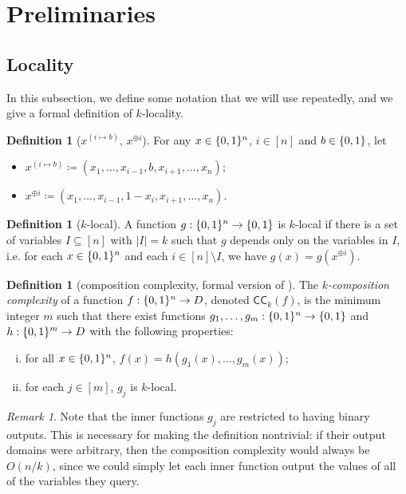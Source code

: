 \documentclass[10pt,a4paper]{article}
\theoremstyle{definition}
\newtheorem{definition}[lemma]{Definition}
\theoremstyle{remark}
\newtheorem{remark}[lemma]{Remark}
\DeclarePairedDelimiter{\set}{\{}{\}}
\newcommand{\zo}{\set{0,1}}
\newcommand{\CC}{\mathsf{CC}}
\begin{document}


\section{Preliminaries}

\subsection{Locality}
In this subsection, we define some notation that we will use repeatedly, and we give a formal definition of $k$-locality.

\begin{definition}[$x^{(i \mapsto b)}$, $x^{\oplus i}$]
For any $x \in \zo^n$, $i \in [n]$ and $b \in \zo$, let
\begin{itemize}
    \item $x^{(i \mapsto b)} \coloneqq (x_1, \ldots, x_{i-1}, b, x_{i+1}, \ldots, x_n)$;
    \item $x^{\oplus i} \coloneqq (x_1, \ldots, x_{i-1}, 1-x_i, x_{i+1}, \ldots, x_n)$.
\end{itemize}
\end{definition}

\begin{definition}[$k$-local]
A function $g: \zo^n \to \zo$ is $k$-local if there is a set of variables $I \subseteq [n]$ with $|I|=k$ such that $g$ depends only on the variables in $I$, i.e. for each $x\in \zo^n$ and each $i \in [n] \setminus I$, we have $g(x) = g(x^{\oplus i})$.
\end{definition}

\begin{definition}[composition complexity, formal version of ]
The \emph{$k$-composition complexity} of a function $f: \zo^n \to D$, denoted $\CC_k(f)$, is the minimum integer $m$ such that there exist functions $g_1, \ldots, g_m : \zo^n \to \zo$ and $h:\zo^m \to D$
with the following properties:
\begin{enumerate}[(i)]
    \item for all $x \in \zo^n$, $f(x) = h(g_1(x), \ldots, g_m(x))$;
    \item for each $j \in [m]$, $g_j$ is $k$-local.
\end{enumerate}
\end{definition}

\begin{remark}
Note that the inner functions $g_j$ are restricted to having binary outputs.
This is necessary for making the definition nontrivial: if their output domains were arbitrary, then the composition complexity would always be $O(n/k)$,
since we could simply let each inner function output the values of all of the variables they query.
\end{remark}
\end{document}
